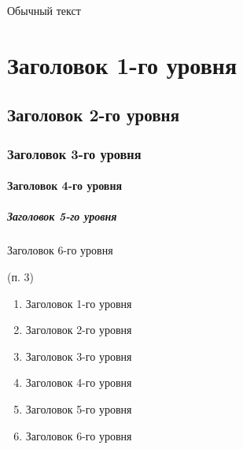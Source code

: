 Обычный текст

\hypertarget{ux437ux430ux433ux43eux43bux43eux432ux43eux43a-1-ux433ux43e-ux443ux440ux43eux432ux43dux44f}{%
\section{Заголовок 1-го
уровня}\label{ux437ux430ux433ux43eux43bux43eux432ux43eux43a-1-ux433ux43e-ux443ux440ux43eux432ux43dux44f}}

\hypertarget{ux437ux430ux433ux43eux43bux43eux432ux43eux43a-2-ux433ux43e-ux443ux440ux43eux432ux43dux44f}{%
\subsection{Заголовок 2-го
уровня}\label{ux437ux430ux433ux43eux43bux43eux432ux43eux43a-2-ux433ux43e-ux443ux440ux43eux432ux43dux44f}}

\hypertarget{ux437ux430ux433ux43eux43bux43eux432ux43eux43a-3-ux433ux43e-ux443ux440ux43eux432ux43dux44f}{%
\subsubsection{Заголовок 3-го
уровня}\label{ux437ux430ux433ux43eux43bux43eux432ux43eux43a-3-ux433ux43e-ux443ux440ux43eux432ux43dux44f}}

\hypertarget{ux437ux430ux433ux43eux43bux43eux432ux43eux43a-4-ux433ux43e-ux443ux440ux43eux432ux43dux44f}{%
\paragraph{Заголовок 4-го
уровня}\label{ux437ux430ux433ux43eux43bux43eux432ux43eux43a-4-ux433ux43e-ux443ux440ux43eux432ux43dux44f}}

\hypertarget{ux437ux430ux433ux43eux43bux43eux432ux43eux43a-5-ux433ux43e-ux443ux440ux43eux432ux43dux44f}{%
\subparagraph{Заголовок 5-го
уровня}\label{ux437ux430ux433ux43eux43bux43eux432ux43eux43a-5-ux433ux43e-ux443ux440ux43eux432ux43dux44f}}

Заголовок 6-го уровня

(п. 3)

\begin{enumerate}
\def\labelenumi{\arabic{enumi}.}
\tightlist
\item
  Заголовок 1-го уровня
\item
  Заголовок 2-го уровня
\item
  Заголовок 3-го уровня
\item
  Заголовок 4-го уровня
\item
  Заголовок 5-го уровня
\item
  Заголовок 6-го уровня
\end{enumerate}

